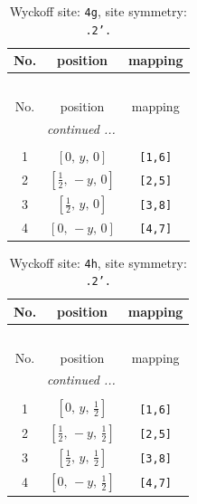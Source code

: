 \documentclass[fleqn,8pt]{jsarticle}
\begin{document}
\begin{longtable}{ccc}
\caption{Wyckoff site: {\tt 4g}, site symmetry: {\tt .2'.}}
 \\
 \hline \hline
No. & position & mapping \\ \hline \endfirsthead

\multicolumn{2}{l}{\tablename\ \thetable{}} \\
 \hline \hline
No. & position & mapping \\ \hline \endhead

 \hline \hline
\multicolumn{2}{r}{\footnotesize\it continued ...} \\ \endfoot

 \hline \hline
\multicolumn{2}{r}{} \\ \endlastfoot

1 & $\left[ 0,\, y,\, 0 \right]$ & {\tt [1,6]} \\ \hline
2 & $\left[ \frac{1}{2},\, - y,\, 0 \right]$ & {\tt [2,5]} \\ \hline
3 & $\left[ \frac{1}{2},\, y,\, 0 \right]$ & {\tt [3,8]} \\ \hline
4 & $\left[ 0,\, - y,\, 0 \right]$ & {\tt [4,7]} \\
\end{longtable}
\renewcommand{\arraystretch}{1.2}
\begin{longtable}{ccc}
\caption{Wyckoff site: {\tt 4h}, site symmetry: {\tt .2'.}}
 \\
 \hline \hline
No. & position & mapping \\ \hline \endfirsthead

\multicolumn{2}{l}{\tablename\ \thetable{}} \\
 \hline \hline
No. & position & mapping \\ \hline \endhead

 \hline \hline
\multicolumn{2}{r}{\footnotesize\it continued ...} \\ \endfoot

 \hline \hline
\multicolumn{2}{r}{} \\ \endlastfoot

1 & $\left[ 0,\, y,\, \frac{1}{2} \right]$ & {\tt [1,6]} \\ \hline
2 & $\left[ \frac{1}{2},\, - y,\, \frac{1}{2} \right]$ & {\tt [2,5]} \\ \hline
3 & $\left[ \frac{1}{2},\, y,\, \frac{1}{2} \right]$ & {\tt [3,8]} \\ \hline
4 & $\left[ 0,\, - y,\, \frac{1}{2} \right]$ & {\tt [4,7]} \\
\end{longtable}
\end{document}
